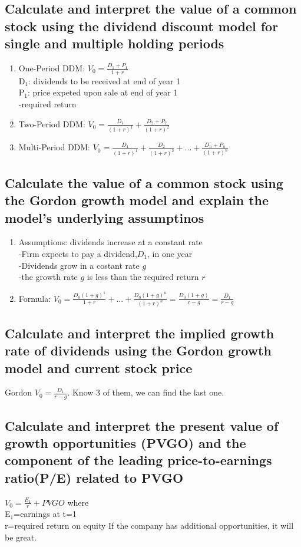 \documentclass{article}
\newcommand{\be}{\begin{enumerate}}
\newcommand{\ee}{\end{enumerate}}
\begin{document}
\subsection{Calculate and interpret the value of a common stock using the dividend
discount model for single and multiple holding periods}
\be
    \item One-Period DDM: $V_0=\frac{D_1+P_1}{1+r}$
        \\D$_1$: dividends to be received at end of year 1
        \\P$_1$: price expeted upon sale at end of year 1
        \\-required return
    \item Two-Period DDM: $V_0=\frac{D_1}{(1+r)^1}+\frac{D_2+P_2}{(1+r)^2}$
    \item Multi-Period DDM: $V_0=\frac{D_1}{(1+r)^1}+\frac{D_2}{(1+r)^2}+...+\frac{D_n+P_n}{(1+r)^n}$
\ee
\subsection{Calculate the value of a common stock using the Gordon growth model and
explain the model's underlying assumptinos}
\be
    \item Assumptions: dividends increase at a constant rate
        \\-Firm expects to pay a dividend,$D_1$, in one year
        \\-Dividends grow in a costant rate $g$
        \\-the growth rate $g$ is less than the required return $r$
    \item Formula:
        $V_0=\frac{D_0(1+g)^1}{1+r}+...+\frac{D_0(1+g)^n}{(1+r)^n}=\frac{D_0(1+g)}{r-g}
        =\frac{D_1}{r-g}$
\ee
\subsection{Calculate and interpret the implied growth rate of dividends using
the Gordon growth model and current stock price}
Gordon $V_0=\frac{D_1}{r-g}$. Know 3 of them, we can find the last one.
\subsection{Calculate and interpret the present value of growth opportunities
(PVGO) and the component of the leading price-to-earnings ratio(P/E) related to PVGO}
$V_0=\frac{E_1}{r}+PVGO$
where
\\E$_1$=earnings at t=1
\\r=required return on equity
If the company has additional opportunities, it will be great.
\end{document}
